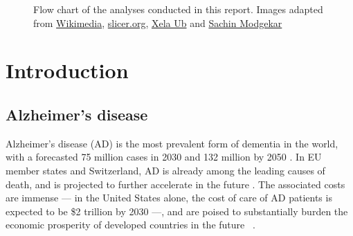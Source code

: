 \documentclass{article}
\begin{document}
\begin{figure}[b]
  \caption{Flow chart of the analyses conducted in this report. Images adapted from \href{https://commons.wikimedia.org/wiki/Brain/media/File:MRI_head_side.jpg}{Wikimedia},
\href{https://www.slicer.org/wiki/Documentation/Nightly/Modules/BrainVolumeRefinement}{ slicer.org}, \href{https://thenounproject.com/xela./collection/diagrams/?i=486221}{Xela Ub} and
\href{https://thenounproject.com/smodgekar/collection/data-classify/}{Sachin Modgekar}}
\label{fig:graphical_abstract}
\end{figure}

\section{Introduction}

\subsection{Alzheimer's disease}\label{sec:ad_context}

Alzheimer's disease (AD) is the most prevalent form of dementia in the world, with a forecasted 75 million cases in 2030 and 132 million by 2050 \citep{world2017global}. In EU member states and Switzerland, AD is already among the leading causes of death, and is projected to further accelerate in the future \citep{sleeman2019escalating}. The associated costs are immense --- in the United States alone, the cost of care of AD patients is expected to be \$2 trillion by 2030 ---, and are poised to substantially burden the economic prosperity of developed countries in the future ~\citep{world2017global}.
\end{document}
